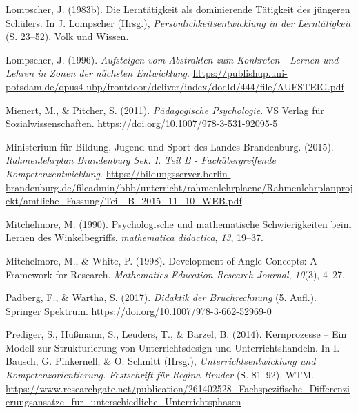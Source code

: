 \documentclass[
]{scrbook}
\newlength{\cslhangindent}
\newlength{\cslentryspacingunit} %
\newenvironment{CSLReferences}[2] %
 {%
  \setlength{\parindent}{0pt}
  \ifodd #1
  \let\oldpar\par
  \def\par{\hangindent=\cslhangindent\oldpar}
  \fi
  \setlength{\parskip}{#2\cslentryspacingunit}
 }%
 {}
\theoremstyle{definition}
\theoremstyle{definition}
\theoremstyle{definition}
\theoremstyle{definition}
\theoremstyle{remark}
\begin{document}
\begin{CSLReferences}{1}{0}
\leavevmode{}%
Lompscher, J. (1983b). Die {Lerntätigkeit} als dominierende {Tätigkeit} des jüngeren {Schülers}. In J. Lompscher (Hrsg.), \emph{Persönlichkeitsentwicklung in der {Lerntätigkeit}} (S. 23--52). Volk und Wissen.

\leavevmode{}%
Lompscher, J. (1996). \emph{Aufsteigen vom {Abstrakten} zum {Konkreten} - {Lernen} und {Lehren} in {Zonen} der nächsten {Entwicklung}}. \url{https://publishup.uni-potsdam.de/opus4-ubp/frontdoor/deliver/index/docId/444/file/AUFSTEIG.pdf}

\leavevmode{}%
Mienert, M., \& Pitcher, S. (2011). \emph{Pädagogische {Psychologie}}. VS Verlag für Sozialwissenschaften. \url{https://doi.org/10.1007/978-3-531-92095-5}

\leavevmode{}%
Ministerium für Bildung, Jugend und Sport des Landes Brandenburg. (2015). \emph{Rahmenlehrplan {Brandenburg} {Sek}. {I}. {Teil} {B} - {Fachübergreifende} {Kompetenzentwicklung}}. \url{https://bildungsserver.berlin-brandenburg.de/fileadmin/bbb/unterricht/rahmenlehrplaene/Rahmenlehrplanprojekt/amtliche_Fassung/Teil_B_2015_11_10_WEB.pdf}

\leavevmode{}%
Mitchelmore, M. (1990). Psychologische und mathematische Schwierigkeiten beim Lernen des Winkelbegriffs. \emph{mathematica didactica}, \emph{13}, 19--37.

\leavevmode{}%
Mitchelmore, M., \& White, P. (1998). Development of {Angle} {Concepts}: {A} {Framework} for {Research}. \emph{Mathematics Education Research Journal}, \emph{10}(3), 4--27.

\leavevmode{}%
Padberg, F., \& Wartha, S. (2017). \emph{Didaktik der {Bruchrechnung}} (5. Aufl.). Springer Spektrum. \url{https://doi.org/10.1007/978-3-662-52969-0}

\leavevmode{}%
Prediger, S., Hußmann, S., Leuders, T., \& Barzel, B. (2014). Kernprozesse -- {Ein} {Modell} zur {Strukturierung} von {Unterrichtsdesign} und {Unterrichtshandeln}. In I. Bausch, G. Pinkernell, \& O. Schmitt (Hrsg.), \emph{Unterrichtsentwicklung und {Kompetenzorientierung}. {Festschrift} für {Regina} {Bruder}} (S. 81--92). WTM. \url{https://www.researchgate.net/publication/261402528_Fachspezifische_Differenzierungsansatze_fur_unterschiedliche_Unterrichtsphasen}


\end{CSLReferences}
\end{document}
